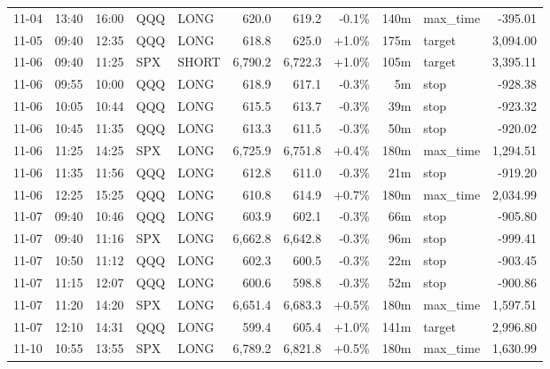 \documentclass[11pt,a4paper,twoside]{article}
\begin{document}
\begin{center}
\begin{longtable}{>{\color{txtmain}}l l l l l r r r r >{\color{txtmain}}l r}
11-04 & 13:40 & 16:00 & QQQ & LONG & 620.0 & 619.2 & \textcolor{lossred}{-0.1\%} & 140m & max\_time & \textcolor{lossred}{-395.01} \\
11-05 & 09:40 & 12:35 & QQQ & LONG & 618.8 & 625.0 & \textcolor{wingreen}{+1.0\%} & 175m & target & \textcolor{wingreen}{3,094.00} \\
11-06 & 09:40 & 11:25 & SPX & SHORT & 6,790.2 & 6,722.3 & \textcolor{wingreen}{+1.0\%} & 105m & target & \textcolor{wingreen}{3,395.11} \\
11-06 & 09:55 & 10:00 & QQQ & LONG & 618.9 & 617.1 & \textcolor{lossred}{-0.3\%} & 5m & stop & \textcolor{lossred}{-928.38} \\
11-06 & 10:05 & 10:44 & QQQ & LONG & 615.5 & 613.7 & \textcolor{lossred}{-0.3\%} & 39m & stop & \textcolor{lossred}{-923.32} \\
11-06 & 10:45 & 11:35 & QQQ & LONG & 613.3 & 611.5 & \textcolor{lossred}{-0.3\%} & 50m & stop & \textcolor{lossred}{-920.02} \\
11-06 & 11:25 & 14:25 & SPX & LONG & 6,725.9 & 6,751.8 & \textcolor{wingreen}{+0.4\%} & 180m & max\_time & \textcolor{wingreen}{1,294.51} \\
11-06 & 11:35 & 11:56 & QQQ & LONG & 612.8 & 611.0 & \textcolor{lossred}{-0.3\%} & 21m & stop & \textcolor{lossred}{-919.20} \\
11-06 & 12:25 & 15:25 & QQQ & LONG & 610.8 & 614.9 & \textcolor{wingreen}{+0.7\%} & 180m & max\_time & \textcolor{wingreen}{2,034.99} \\
11-07 & 09:40 & 10:46 & QQQ & LONG & 603.9 & 602.1 & \textcolor{lossred}{-0.3\%} & 66m & stop & \textcolor{lossred}{-905.80} \\
11-07 & 09:40 & 11:16 & SPX & LONG & 6,662.8 & 6,642.8 & \textcolor{lossred}{-0.3\%} & 96m & stop & \textcolor{lossred}{-999.41} \\
11-07 & 10:50 & 11:12 & QQQ & LONG & 602.3 & 600.5 & \textcolor{lossred}{-0.3\%} & 22m & stop & \textcolor{lossred}{-903.45} \\
11-07 & 11:15 & 12:07 & QQQ & LONG & 600.6 & 598.8 & \textcolor{lossred}{-0.3\%} & 52m & stop & \textcolor{lossred}{-900.86} \\
11-07 & 11:20 & 14:20 & SPX & LONG & 6,651.4 & 6,683.3 & \textcolor{wingreen}{+0.5\%} & 180m & max\_time & \textcolor{wingreen}{1,597.51} \\
11-07 & 12:10 & 14:31 & QQQ & LONG & 599.4 & 605.4 & \textcolor{wingreen}{+1.0\%} & 141m & target & \textcolor{wingreen}{2,996.80} \\
11-10 & 10:55 & 13:55 & SPX & LONG & 6,789.2 & 6,821.8 & \textcolor{wingreen}{+0.5\%} & 180m & max\_time & \textcolor{wingreen}{1,630.99} \\

\end{longtable}
\end{center}
\end{document}
